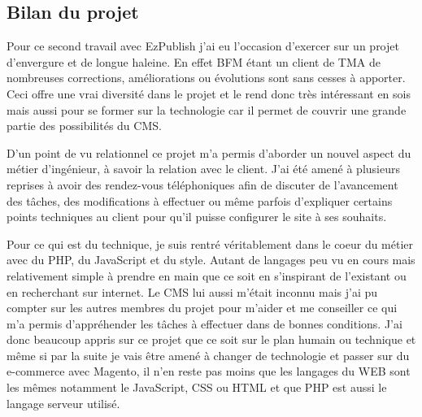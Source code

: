 \documentclass[a4paper,11pt,twoside]{report}
\begin{document}
    \subsection*{Bilan du projet}
    Pour ce second travail avec EzPublish j'ai eu l'occasion d'exercer sur un projet d'envergure et de longue haleine. En effet BFM étant un client de TMA de nombreuses corrections, améliorations ou évolutions sont sans cesses à apporter. Ceci offre une vrai diversité dans le projet et le rend donc très intéressant en sois mais aussi pour se former sur la technologie car il permet de couvrir une grande partie des possibilités du CMS. 
    
    D'un point de vu relationnel ce projet m'a permis d'aborder un nouvel aspect du métier d'ingénieur, à savoir la relation avec le client. J'ai été amené à plusieurs reprises à avoir des rendez-vous téléphoniques afin de discuter de l'avancement des tâches, des modifications à effectuer ou même parfois d'expliquer certains points techniques au client pour qu'il puisse configurer le site à ses souhaits. 
    
    Pour ce qui est du technique, je suis rentré véritablement dans le coeur du métier avec du PHP, du JavaScript et du style. Autant de langages peu vu en cours mais relativement simple à prendre en main que ce soit en s'inspirant de l'existant ou en recherchant sur internet. Le CMS lui aussi m'était inconnu mais j'ai pu compter sur les autres membres du projet pour m'aider et me conseiller ce qui m'a permis d'appréhender les tâches à effectuer dans de bonnes conditions. J'ai donc beaucoup appris sur ce projet que ce soit sur le plan humain ou technique et même si par la suite je vais être amené à changer de technologie et passer sur du e-commerce avec Magento, il n'en reste pas moins que les langages du WEB sont les mêmes notamment le JavaScript, CSS ou HTML et que PHP est aussi le langage serveur utilisé. 
    
\end{document}
